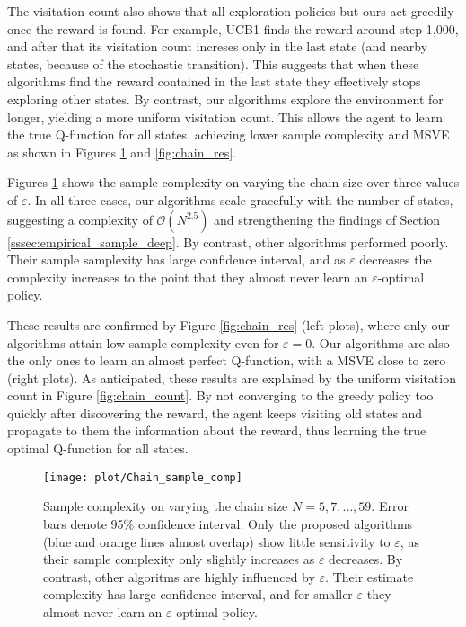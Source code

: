 \documentclass{article}
\newcommand{\bigO}{\mathcal{O}}
\begin{document}
The visitation count also shows that all exploration policies but ours act greedily once the reward is found. For example, UCB1 finds the reward around step 1,000, and after that its visitation count increses only in the last state (and nearby states, because of the stochastic transition). 
This suggests that when these algorithms find the reward contained in the last state they effectively stops exploring other states.
By contrast, our algorithms explore the environment for longer, yielding a more uniform visitation count. This allows the agent to learn the true Q-function for all states, achieving lower sample complexity and MSVE as shown in Figures \ref{fig:empirical_sample_chain} and \ref{fig:chain_res}.

Figures \ref{fig:empirical_sample_chain} shows the sample complexity on varying the chain size over three values of $\varepsilon$. In all three cases, our algorithms scale gracefully with the number of states, suggesting a complexity of $\bigO(N^{2.5})$ and strengthening the findings of Section \ref{sssec:empirical_sample_deep}. By contrast, other algorithms performed poorly. Their sample samplexity has large confidence interval, and as $\varepsilon$ decreases the complexity increases to the point that they almost never learn an $\varepsilon$-optimal policy.

These results are confirmed by Figure \ref{fig:chain_res} (left plots), where only our algorithms attain low sample complexity even for $\varepsilon = 0$. Our algorithms are also the only ones to learn an almost perfect Q-function, with a MSVE close to zero (right plots). As anticipated, these results are explained by the uniform visitation count in Figure \ref{fig:chain_count}. By not converging to the greedy policy too quickly after discovering the reward, the agent keeps visiting old states and propagate to them the information about the reward, thus learning the true optimal Q-function for all states.

\begin{figure}[t]
	\centering
	\texttt{[image: plot/Chain\_sample\_comp]}
	\caption{\label{fig:empirical_sample_chain} Sample complexity on varying the chain size $N = 5, 7, \ldots, 59$. Error bars denote 95\% confidence interval. Only the proposed algorithms (blue and orange lines almost overlap) show little sensitivity to $\varepsilon$, as their sample complexity only slightly increases as $\varepsilon$ decreases. By contrast, other algoritms are highly influenced by $\varepsilon$. Their estimate complexity has large confidence interval, and for smaller $\varepsilon$ they almost never learn an $\varepsilon$-optimal policy.}
\end{figure}
\end{document}

